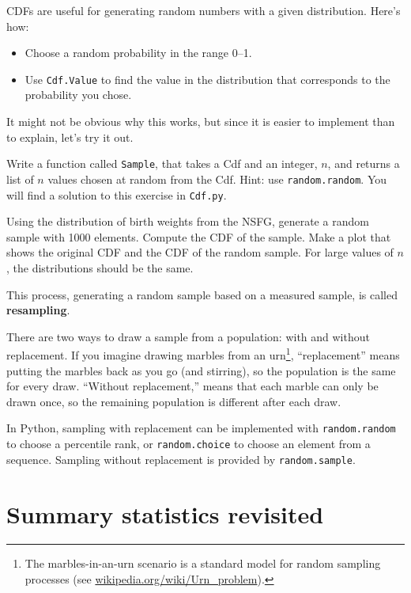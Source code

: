 \documentclass[12pt]{book}
\begin{document}
CDFs are useful for generating random numbers with a given
distribution.  Here's how:

\begin{itemize}

\item Choose a random probability in the range 0--1.

\item Use {\tt Cdf.Value} to find the value in the distribution
that corresponds to the probability you chose.

\end{itemize}

It might not be obvious why this works, but since it is easier
to implement than to explain, let's try it out.

\begin{ex}

Write a function called {\tt Sample}, that takes a Cdf and
an integer, $n$, and returns a list of $n$ values chosen at
random from the Cdf.  Hint: use {\tt random.random}.
You will find a solution to this exercise in {\tt Cdf.py}.

Using the distribution of birth weights from the NSFG, generate a
random sample with 1000 elements.  Compute the CDF of the sample.
Make a plot that shows the original CDF and the CDF of the random
sample.  For large values of $n$, the distributions should be
the same.

\end{ex}

This process, generating a random sample based on a measured sample,
is called {\bf resampling}.

There are two ways to draw a sample from a population: with and
without replacement.  If you imagine drawing marbles from an
urn\footnote{The marbles-in-an-urn scenario is a standard model for
  random sampling processes (see
  \url{wikipedia.org/wiki/Urn_problem}).}, ``replacement'' means
putting the marbles back as you go (and stirring), so the population
is the same for every draw.  ``Without replacement,'' means that each
marble can only be drawn once, so the remaining population is
different after each draw.

In Python, sampling with replacement can be implemented with
{\tt random.random} to choose a percentile rank, or {\tt random.choice}
to choose an element from a sequence.  Sampling without replacement
is provided by {\tt random.sample}.


\section{Summary statistics revisited}
\end{document}
